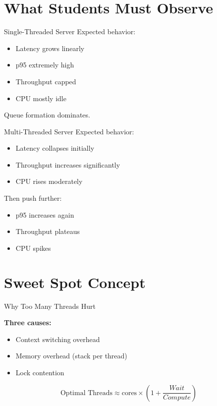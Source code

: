 \documentclass[11pt]{beamer}
\begin{document}
	\section{What Students Must Observe}
	
	\begin{frame}{Single-Threaded Server}
		Expected behavior:
		
		\begin{itemize}
			\item Latency grows linearly
			\item p95 extremely high
			\item Throughput capped
			\item CPU mostly idle
		\end{itemize}

		
		\begin{alertblock}
			Queue formation dominates.
		\end{alertblock}
	\end{frame}
	
	\begin{frame}{Multi-Threaded Server}
		Expected behavior:
		
		\begin{itemize}
			\item Latency collapses initially
			\item Throughput increases significantly
			\item CPU rises moderately
		\end{itemize}

		
		Then push further:
		
		\begin{itemize}
			\item p95 increases again
			\item Throughput plateaus
			\item CPU spikes
		\end{itemize}
	\end{frame}
	
	\section{Sweet Spot Concept}
	
	\begin{frame}{Why Too Many Threads Hurt}
		
		\textbf{Three causes:}
		
		\begin{itemize}
			\item Context switching overhead
			\item Memory overhead (stack per thread)
			\item Lock contention
		\end{itemize}

		
		\[
		\text{Optimal Threads}
		\approx
		\text{cores} \times
		\left(1 + \frac{Wait}{Compute}\right)
		\]
	\end{frame}
	
\end{document}
